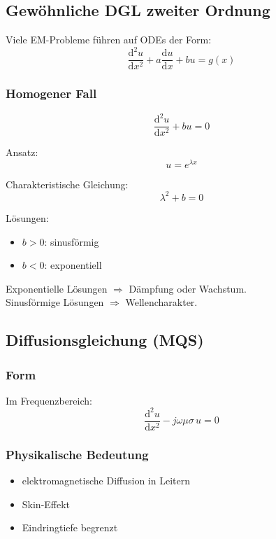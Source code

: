 \documentclass[a4paper]{article}
\renewcommand{\dd}{\mathrm{d}}
\begin{document}
\subsection{Gewöhnliche DGL zweiter Ordnung}

Viele EM-Probleme führen auf ODEs der Form:
\[
\frac{\dd^2 u}{\dd x^2} + a\frac{\dd u}{\dd x} + b u = g(x)
\]

\subsubsection{Homogener Fall}

\[
\frac{\dd^2 u}{\dd x^2} + b u = 0
\]

Ansatz:
\[
u = e^{\lambda x}
\]

Charakteristische Gleichung:
\[
\lambda^2 + b = 0
\]

Lösungen:
\begin{itemize}
  \item $b>0$: sinusförmig
  \item $b<0$: exponentiell
\end{itemize}

\begin{schema}
Exponentielle Lösungen $\Rightarrow$ Dämpfung oder Wachstum.\\
Sinusförmige Lösungen $\Rightarrow$ Wellencharakter.
\end{schema}

\subsection{Diffusionsgleichung (MQS)}

\subsubsection{Form}

Im Frequenzbereich:
\[
\frac{\dd^2 u}{\dd x^2} - j\omega\mu\sigma\,u = 0
\]

\subsubsection{Physikalische Bedeutung}

\begin{itemize}
  \item elektromagnetische Diffusion in Leitern
  \item Skin-Effekt
  \item Eindringtiefe begrenzt
\end{itemize}
\end{document}
